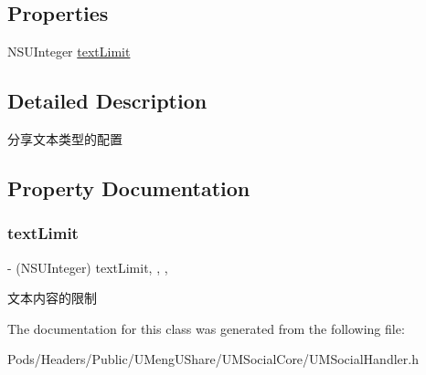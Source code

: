 \subsection*{Properties}
\begin{DoxyCompactItemize}
\item 
N\+S\+U\+Integer \mbox{\hyperlink{interface_u_m_social_share_text_object_config_a3aa4aab117bb9ae5244068613d4e2211}{text\+Limit}}
\end{DoxyCompactItemize}


\subsection{Detailed Description}
分享文本类型的配置 

\subsection{Property Documentation}
\mbox{\label{interface_u_m_social_share_text_object_config_a3aa4aab117bb9ae5244068613d4e2211}} 
\subsubsection{\texorpdfstring{text\+Limit}{textLimit}}
{\footnotesize\ttfamily -\/ (N\+S\+U\+Integer) text\+Limit\hspace{0.3cm}{\ttfamily [read]}, {\ttfamily [write]}, {\ttfamily [nonatomic]}, {\ttfamily [assign]}}

文本内容的限制 

The documentation for this class was generated from the following file\+:\begin{DoxyCompactItemize}
\item 
Pods/\+Headers/\+Public/\+U\+Meng\+U\+Share/\+U\+M\+Social\+Core/U\+M\+Social\+Handler.\+h\end{DoxyCompactItemize}
